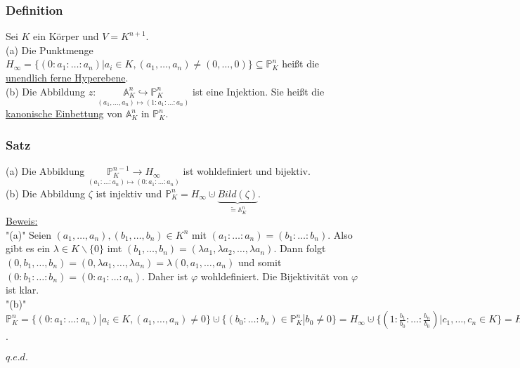 \documentclass[a4paper]{article}
\newcommand{\ul}{\underline}
\renewcommand{\proof}{\ul{Beweis:}\\}
\renewcommand{\qed}{\begin{flushright}
\ul{\(q.e.d.\)}
\end{flushright}}
\let\phi\varphi
\begin{document}
\subsubsection{Definition}
Sei \(K\) ein Körper und \(V=K^{n+1}\).\\
(a) Die Punktmenge \(H_\infty=\{(0:a_1:\dots:a_n)|a_i\in K,(a_1,\dots,a_n)\neq (0,\dots,0)\}\subseteq\mathbb{P}_K^n\) heißt die \ul{unendlich ferne Hyperebene}.\\
(b) Die Abbildung \(z:\underset{(a_1,\dots,a_n)\mapsto(1:a_1:\dots:a_n)}{\mathbb{A}_K^n\hookrightarrow \mathbb{P}_K^n}\) ist eine Injektion. Sie heißt die \ul{kanonische Einbettung} von \(\mathbb{A}_K^n\) in \(\mathbb{P}_K^n\).
\subsubsection{Satz}
(a) Die Abbildung \(\underset{(a_1:\dots:a_n)\mapsto(0:a_1:\dots:a_n)}{\mathbb{P}_K^{n-1}\rightarrow H_\infty}\) ist wohldefiniert und bijektiv.\\
(b) Die Abbildung \(\zeta\) ist injektiv und \(\mathbb{P}_K^n=H_\infty\cupdot \underbrace{Bild(\zeta)}_{\tilde{=}\mathbb{A}_K^n}\).\\
\proof
"(a)" Seien \((a_1,\dots,a_n),(b_1,\dots,b_n)\in K^n\) mit \((a_1:\dots:a_n)=(b_1:\dots:b_n)\). Also gibt es ein \(\lambda\in K\backslash\{0\}\) imt \((b_1,\dots,b_n)=(\lambda a_1,\lambda a_2, \dots,\lambda a_n)\). Dann folgt \((0,b_1,\dots,b_n)=(0,\lambda a_1,\dots,\lambda a_n)=\lambda(0,a_1,\dots,a_n)\) und somit \((0:b_1:\dots:b_n)=(0:a_1:\dots:a_n)\). Daher ist \(\phi\) wohldefiniert. Die Bijektivität von \(\phi\) ist klar.\\
"(b)" \(\mathbb{P}_K^n=\{(0:a_1:\dots:a_n)|a_i\in K, (a_1,\dots,a_n)\neq 0\}\cupdot\{(b_0:\dots:b_n)\in \mathbb{P}_K^n|b_0\neq 0\}=H_\infty\cupdot\{(1:\frac{b_1}{b_0}:\dots:\frac{b_n}{b_0})|c_1,\dots,c_n\in K\}=H_\infty\cupdot\zeta (\mathbb{A_K^n})\).
\qed
\end{document}
